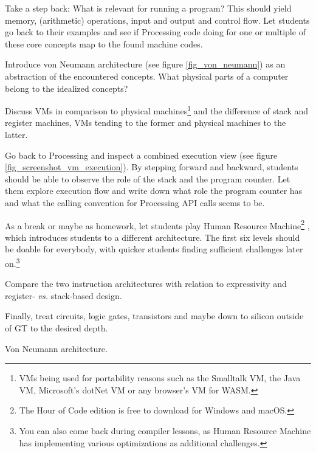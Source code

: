 \begin{instructions}
\item Take a step back: What is relevant for running a program? This should yield memory, (arithmetic) operations, input and output and control flow. Let students go back to their examples and see if Processing code doing for one or multiple of these core concepts map to the found machine codes.
\item Introduce von Neumann architecture (see figure \ref{fig_von_neumann}) as an abstraction of the encountered concepts. What physical parts of a computer belong to the idealized concepts?
\item Discuss \acp{VM} in comparison to physical machines\footnote{\acp{VM} being used for portability reasons such as the Smalltalk \ac{VM}, the Java \ac{VM}, Microsoft's dotNet \ac{VM} or any browser's \ac{VM} for WASM.} and the difference of stack and register machines, \acp{VM} tending to the former and physical machines to the latter.
\item Go back to Processing and inspect a combined execution view (see figure \ref{fig_screenshot_vm_execution}). By stepping forward and backward, students should be able to observe the role of the stack and the program counter. Let them explore execution flow and write down what role the program counter has and what the calling convention for Processing \ac{API} calls seems to be.
\item As a break or maybe as homework, let students play Human Resource Machine\footnote{The Hour of Code edition is free to download for Windows and macOS.} \cite{Tom15}, which introduces students to a different architecture. The first six levels should be doable for everybody, with quicker students finding sufficient challenges later on.\footnote{You can also come back during compiler lessons, as Human Resource Machine has implementing various optimizations as additional challenges.}
\item Compare the two instruction architectures with relation to expressivity and register- \emph{vs.} stack-based design.

\item Finally, treat circuits, logic gates, transistors and maybe down to silicon outside of \ac{GT} to the desired depth.
\end{instructions}

\begin{cfigure}{Von Neumann architecture.}

\end{cfigure}



